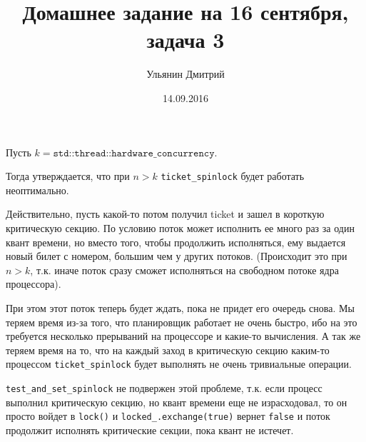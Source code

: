 \documentclass[]{article}
\title{Домашнее задание на 16 сентября, задача 3}
\author{Ульянин Дмитрий}
\date{14.09.2016}
\begin{document}
\maketitle

Пусть $k = \texttt{std::thread::hardware\_concurrency}$.

Тогда утверждается, что при $n > k$ \texttt{ticket\_spinlock} будет работать неоптимально.

Действительно, пусть какой-то потом получил ticket и зашел в короткую критическую секцию. По условию поток может исполнить ее много раз за один квант времени, но вместо того, чтобы продолжить исполняться, ему выдается новый билет с номером, большим чем у других потоков. (Происходит это при ${n > k}$, т.к. иначе поток сразу сможет исполняться на свободном потоке ядра процессора).

При этом этот поток теперь будет ждать, пока не придет его очередь снова. Мы теряем время из-за того, что планировщик работает не очень быстро, ибо на это требуется несколько прерываний на процессоре и какие-то вычисления. А так же теряем время на то, что на каждый заход в критическую секцию каким-то процессом \texttt{ticket\_spinlock} будет выполнять не очень тривиальные операции.

\texttt{test\_and\_set\_spinlock} не подвержен этой проблеме, т.к. если процесс выполнил критическую секцию, но квант времени еще не израсходовал, то он просто войдет в \texttt{lock()} и  \texttt{locked\_.exchange(true)} вернет \texttt{false} и поток продолжит исполнять критические секции, пока квант не истечет.
\end{document}
